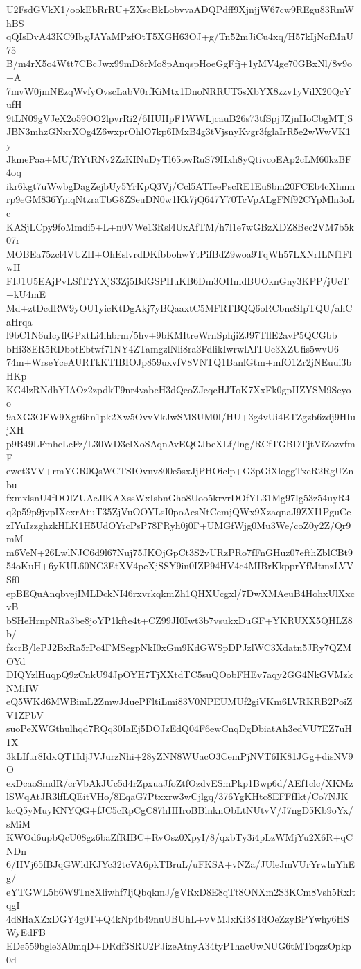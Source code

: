 U2FsdGVkX1/ookEbRrRU+ZXscBkLobvvaADQPdff9XjnjjW67cw9REgu83RmWhBS
qQIsDvA43KC9IbgJAYaMPzfOtT5XGH63OJ+g/Tn52mJiCu4xq/H57kIjNofMnU75
B/m4rX5o4Wtt7CBcJwx99mD8rMo8pAnqspHoeGgFfj+1yMV4ge70GBxNl/8v9o+A
7mvW0jmNEzqWvfyOvscLabV0rfKiMtx1DnoNRRUT5sXbYX8zzv1yVilX20QcYufH
9tLN09gVJeX2o59OO2lpvrRi2/6HUHpF1WWLjcauB26s73tfSpjJZjnHoCbgMTjS
JBN3mhzGNxrXOg4Z6wxprOhlO7kp6IMxB4g3tVjsnyKvgr3fglaIrR5e2wWwVK1y
JkmePaa+MU/RYtRNv2ZzKINuDyTl65owRuS79Hxh8yQtivcoEAp2cLM60kzBF4oq
ikr6kgt7uWwbgDagZejbUy5YrKpQ3Vj/Ccl5ATIeePscRE1Eu8bm20FCEb4cXhnm
rp9eGM836YpiqNtzraTbG8ZSeuDN0w1Kk7jQ647Y70TcVpALgFNf92CYpMln3oLc
KASjLCpy9foMmdi5+L+n0VWe13Rsl4UxAfTM/h7l1e7wGBzXDZ8Bec2VM7b5k07r
MOBEa75zcl4VUZH+OhEslvrdDKfbbohwYtPifBdZ9woa9TqWh57LXNrILNf1FIwH
FIJ1U5EAjPvLSfT2YXjS3Zj5BdGSPHuKB6Dm3OHmdBUOknGny3KPP/jUcT+kU4mE
Md+ztDcdRW9yOU1yicKtDgAkj7yBQaaxtC5MFRTBQQ6oRCbncSIpTQU/ahCaHrqa
l9bC1N6uIcyflGPxtLi4lhbrm/5hv+9bKMItreWrnSphjiZJ97TllE2avP5QCGbb
bHi38ER5RDbotEbtwf71NY4ZTamgzlNli8ra3FdlikIwrwlAlTUe3XZUfis5wvU6
74m+WrseYceAURTkKTIBIOJp859uxvfV8VNTQ1BanlGtm+mfO1Zr2jNEuui3bHKp
KG4lzRNdhYIAOz2zpdkT9nr4vabeH3dQeoZJeqcHJToK7XxFk0gpIIZYSM9Seyoo
9aXG3OFW9Xgt6hn1pk2Xw5OvvVkJwSMSUM0I/HU+3g4vUi4ETZgzb6zdj9HIujXH
p9B49LFmheLcFz/L30WD3elXoSAqnAvEQGJbeXLf/lng/RCfTGBDTjtViZozvfmF
ewet3VV+rmYGR0QsWCTSIOvnv800e5sxJjPHOiclp+G3pGiXloggTxcR2RgUZnbu
fxmxlsnU4fDOIZUAcJlKAXssWxIsbnGho8Uoo5krvrDOfYL31Mg97Ig53z54uyR4
q2p59p9jvpIXexrAtuT35ZjVuOOYLsI0poAesNtCemjQWx9XzaqnaJ9ZXI1PguCe
zIYuIzzghzkHLK1H5UdOYrcPsP78FRyh0j0F+UMGfWjg0Mu3We/coZ0y2Z/Qr9mM
m6VeN+26LwlNJC6d9l67Nuj75JKOjGpCt3S2vURzPRo7fFnGHuz07efthZblCBt9
54oKuH+6yKUL60NC3EtXV4peXjSSY9in0IZP94HV4c4MIBrKkpprYfMtmzLVVSf0
epBEQuAnqbvejIMLDckNI46rxvrkqkmZh1QHXUcgxl/7DwXMAeuB4HohxUlXxcvB
bSHeHrnpNRa3be8joYP1kfte4t+CZ99JI0Iwt3b7vsukxDuGF+YKRUXX5QHLZ8b/
fzcrB/lePJ2BxRa5rPc4FMSegpNkI0xGm9KdGWSpDPJzlWC3Xdatn5JRy7QZMOYd
DIQYzlHuqpQ9zCnkU94JpOYH7TjXXtdTC5suQOobFHEv7aqy2GG4NkGVMzkNMiIW
eQ5WKd6MWBimL2ZmwJduePFltiLmi83V0NPEUMUf2giVKm6LVRKRB2PoiZV1ZPbV
suoPeXWGthulhqd7RQq30IaEj5DOJzEdQ04F6ewCnqDgDbiatAh3edVU7EZ7uH1X
3kLIfur8IdxQT1IdjJVJurzNhi+28yZNN8WUacO3CemPjNVT6IK81JGg+disNV9O
exDcaoSmdR/crVbAkJUc5d4rZpxuaJfoZtfOzdvESmPkp1Bwp6d/AEf1clc/XKMz
lSWqAtJR3lfLQEitVHo/8EqaG7Ptxxrw3wCjlgq/376YgKHtc8EFFfIkt/Co7NJK
kcQ5yMuyKNYQG+fJC5cRpCgC87hHHroBBlnknObLtNUtvV/J7ngD5Kb9oYx/sMiM
KWOd6upbQcU08gz6baZfRIBC+RvOsz0XpyI/8/qxbTy3i4pLzWMjYu2X6R+qCNDn
6/HVj65fBJqGWldKJYc32tcVA6pkTBruL/uFKSA+vNZa/JUleJmVUrYrwlnYhEg/
eYTGWL5b6W9Tn8Xliwhf7ljQbqkmJ/gVRxD8E8qTt8ONXm2S3KCm8Vsh5RxltqgI
4d8HaXZxDGY4g0T+Q4kNp4b49nuUBUhL+vVMJxKi38TdOeZzyBPYwhy6HSWyEdFB
EDe559bgle3A0mqD+DRdf3SRU2PJizeAtnyA34tyP1hacUwNUG6tMToqzsOpkp0d
